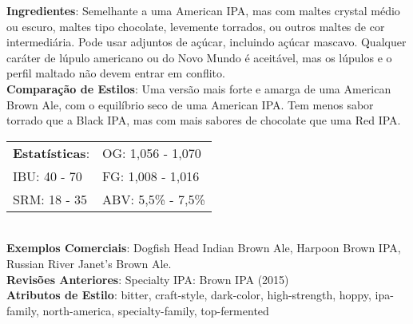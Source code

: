 \textbf{Ingredientes}: Semelhante a uma American IPA, mas com maltes crystal médio ou escuro, maltes tipo chocolate, levemente torrados, ou outros maltes de cor intermediária. Pode usar adjuntos de açúcar, incluindo açúcar mascavo. Qualquer caráter de lúpulo americano ou do Novo Mundo é aceitável, mas os lúpulos e o perfil maltado não devem entrar em conflito. \\
\textbf{Comparação de Estilos}: Uma versão mais forte e amarga de uma American Brown Ale, com o equilíbrio seco de uma American IPA. Tem menos sabor torrado que a Black IPA, mas com mais sabores de chocolate que uma Red IPA. \\
\begin{tabular}{@{}p{35mm}p{35mm}@{}}
  \textbf{Estatísticas}: & OG: 1,056 - 1,070 \\
  IBU: 40 - 70  & FG: 1,008 - 1,016 \\
  SRM: 18 - 35  & ABV: 5,5\% - 7,5\%
\end{tabular}\\
\textbf{Exemplos Comerciais}: Dogfish Head Indian Brown Ale, Harpoon Brown IPA, Russian River Janet’s Brown Ale. \\
\textbf{Revisões Anteriores}: Specialty IPA: Brown IPA (2015) \\
\textbf{Atributos de Estilo}: bitter, craft-style, dark-color, high-strength, hoppy, ipa-family, north-america, specialty-family, top-fermented
